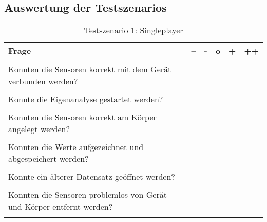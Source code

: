 \subsection{Auswertung der Testszenarios}
\begin{table}[h!tp]
	\begin{center}
		\begin{tabular}{@{}|l|c|c|c|c|r|@{}}
			\hline
			Frage & -- & - & o & + & ++ \\
			\hline
			 & & & & & \\
			Konnten die Sensoren korrekt mit dem Gerät verbunden werden? & & & & & \\
			 & & & & & \\
			Konnte die Eigenanalyse gestartet werden? & & & & & \\
			 & & & & & \\
			Konnten die Sensoren korrekt am Körper angelegt werden? & & & & & \\
			 & & & & & \\
			Konnten die Werte aufgezeichnet und abgespeichert werden? & & & & & \\
			 & & & & & \\
			Konnte ein älterer Datensatz geöffnet werden? & & & & & \\
			 & & & & & \\
			Konnten die Sensoren problemlos von Gerät und Körper entfernt werden? & & & & & \\
			 & & & & & \\
			\hline
		\end{tabular}
	\end{center}
	\caption{Testszenario 1: Singleplayer}
	\label{tab_test_singleplayer}
\end{table}


